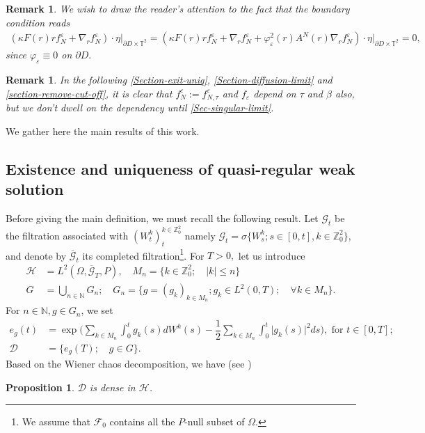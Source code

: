 \documentclass[a4paper,12pt, reqno]{amsart}
\newtheorem{proposition}[theorem]{Proposition}
\newtheorem{remark}[theorem]{Remark}
\begin{document}
   \begin{remark}
      We wish to draw the reader’s attention to the fact that  the boundary condition reads 
    \begin{align*}
        \left( \kappa F(r)r f^{\varepsilon}_N + \nabla_r f^{\varepsilon}_N \right)\cdot \eta \vert_{\partial D\times \mathbb{T}^2}=\left( \kappa F(r)r f^{\varepsilon}_N + \nabla_r f^{\varepsilon}_N+\varphi_\varepsilon^2(r) A^N(r) \nabla_rf^{\varepsilon}_N \right)\cdot \eta \vert_{\partial D\times \mathbb{T}^2}=0,
    \end{align*}
    since $\varphi_\varepsilon\equiv 0$ on $\partial D.$  \end{remark}
\begin{remark}
    In the following \autoref{Section-exit-uniq}, \autoref{Section-diffusion-limit} and \autoref{section-remove-cut-off}, it is clear that $f^\varepsilon_N:=f^\varepsilon_{N,\tau}$ and $f_\varepsilon$ depend on $\tau$ and $\beta$ also, but we don't dwell on the dependency until \autoref{Sec-singular-limit}.
\end{remark}

We  gather here the main results of this work. 
    \subsection{Existence and uniqueness of quasi-regular weak solution} 
    Before giving the main definition, we must recall the following result.
Let  $\mathcal{G}_t$ be  the filtration associated   with     $(W_t^k)_t^{k\in    \mathbb{Z}^2_0}$   namely $
\mathcal{G}_t=\sigma\{W_s^k;  s\in[0,t],  k\in    \mathbb{Z}^2_0\},$
and   denote  by  $\overline{\mathcal{G}}_t$    its completed   filtration\footnote{We assume that $\mathcal{F}_0$ contains all the $P$-null subset of    $\Omega$.}. For $T>0,$  let us  introduce
\begin{align*}
	\mathcal{H}&=L^2(\Omega,\overline{\mathcal{G}}_T,P),   \quad     M_n=\{k\in  \mathbb{Z}^2_0;\quad  \vert   k\vert  \leq    n\}\\
	G&=\displaystyle\bigcup_{n\in\mathbb{N}}G_n;\quad  G_n=\{g=(g_k)_{k\in M_n};    g_k\in  L^2(0,T);\quad    \forall k\in    M_n\}.  \end{align*}
For   $n\in   \mathbb{N}, g\in    G_n$,   we  set
\begin{align*}
	e_g(t)&=\exp{\big(\sum_{k\in M_n}\int_0^tg_k(s)dW^k(s)-\dfrac{1}{2}\sum_{k\in    M_n}\int_0^t\vert   g_k(s)\vert^2   ds\big)}, \text{  for }   t\in[0,T];\\
	\mathcal{D}&=\{e_g(T);    \quad   g\in    G\}.
\end{align*}
Based  on  the Wiener chaos decomposition, we  have (see \cite[Ch.   1]{Nualart2006}) 
\begin{proposition}
    $\mathcal{D}$ is  dense   in  $\mathcal{H}$.
\end{proposition}  
\end{document}
